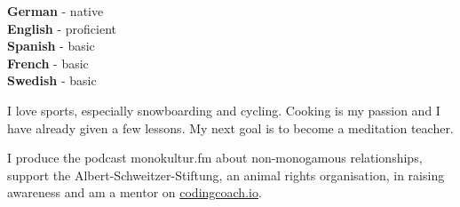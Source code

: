 \documentclass[9pt]{developercv} %
\begin{document}
\begin{minipage}[t]{0.3\textwidth}
	\vspace{-\baselineskip} %

	
	\textbf{German} - native\\
	\textbf{English} - proficient\\
	\textbf{Spanish} - basic\\
	\textbf{French} - basic\\
	\textbf{Swedish} - basic
\end{minipage}
\hfill
\begin{minipage}[t]{0.3\textwidth}
	\vspace{-\baselineskip} %
	
	
  I love sports, especially snowboarding and cycling.
  Cooking is my passion and I have already given a few lessons.
  My next goal is to become a meditation teacher.
\end{minipage}
\hfill
\begin{minipage}[t]{0.3\textwidth}
	\vspace{-\baselineskip} %
	
  
  I produce the podcast monokultur.fm about non-monogamous relationships,
  support the Albert-Schweitzer-Stiftung, an animal rights organisation, in raising awareness
  and am a mentor on \href{https://mentors.codingcoach.io/}{codingcoach.io}.
\end{minipage}



\end{document}
